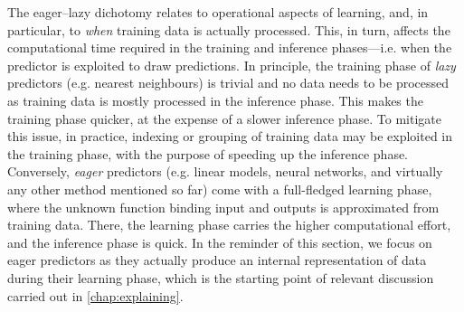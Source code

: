 \documentclass[12pt,a4paper,openright,twoside]{book}
\begin{document}
The eager--lazy dichotomy relates to operational aspects of learning, and, in particular, to \emph{when} training data is actually processed.
%
This, in turn, affects the computational time required in the training and inference phases---i.e. when the predictor is exploited to draw predictions.
%
In principle, the training phase of \emph{lazy} predictors (e.g. nearest neighbours) is trivial and no data needs to be processed as training data is mostly processed in the inference phase.
%
This makes the training phase quicker, at the expense of a slower inference phase.
%
To mitigate this issue, in practice, indexing or grouping of training data may be exploited in the training phase, with the purpose of speeding up the inference phase.
%
Conversely, \emph{eager} predictors (e.g. linear models, neural networks, and virtually any other method mentioned so far) come with a full-fledged learning phase, where the unknown function binding input and outputs is approximated from training data.
%
There, the learning phase carries the higher computational effort, and the inference phase is quick.
%
In the reminder of this section, we focus on eager predictors as they actually produce an internal representation of data during their learning phase, which is the starting point of relevant discussion carried out in \cref{chap:explaining}.
\end{document}

